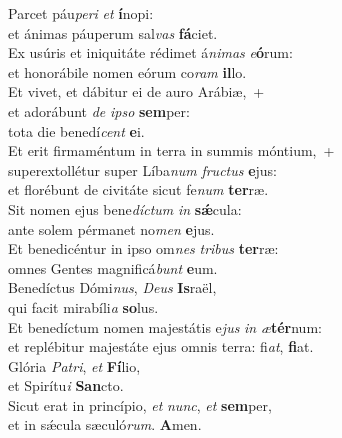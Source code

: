 \oddverse Parcet páu\textit{pe}\textit{ri} \textit{et} \textbf{í}nopi:~\*\\
\oddverse et ánimas páuperum sal\textit{vas} \textbf{fá}ciet.\\
\evenverse Ex usúris et iniquitáte rédimet á\textit{ni}\textit{mas} \textit{e}\textbf{ó}rum:~\*\\
\evenverse et honorábile nomen eórum co\textit{ram} \textbf{il}lo.\\
\oddverse Et vivet, et dábitur ei de auro Arábiæ,~+\\
\oddverse  et adorábunt \textit{de} \textit{i}\textit{pso} \textbf{sem}per:~\*\\
\oddverse tota die benedí\textit{cent} \textbf{e}i.\\
\evenverse Et erit firmaméntum in terra in summis móntium,~+\\
\evenverse  superextollétur super Líba\textit{num} \textit{fru}\textit{ctus} \textbf{e}jus:~\*\\
\evenverse et florébunt de civitáte sicut fe\textit{num} \textbf{ter}ræ.\\
\oddverse Sit nomen ejus bene\textit{dí}\textit{ctum} \textit{in} \textbf{sǽ}cula:~\*\\
\oddverse ante solem pérmanet no\textit{men} \textbf{e}jus.\\
\evenverse Et benedicéntur in ipso om\textit{nes} \textit{tri}\textit{bus} \textbf{ter}ræ:~\*\\
\evenverse omnes Gentes magnificá\textit{bunt} \textbf{e}um.\\
\oddverse Benedíctus Dómi\textit{nus}, \textit{De}\textit{us} \textbf{Is}raël,~\*\\
\oddverse qui facit mirabíli\textit{a} \textbf{so}lus.\\
\evenverse Et benedíctum nomen majestátis e\textit{jus} \textit{in} \textit{æ}\textbf{tér}num:~\*\\
\evenverse et replébitur majestáte ejus omnis terra: fi\textit{at}, \textbf{fi}at.\\
\oddverse Glória \textit{Pa}\textit{tri}, \textit{et} \textbf{Fí}lio,~\*\\
\oddverse et Spirítu\textit{i} \textbf{San}cto.\\
\evenverse Sicut erat in princípio, \textit{et} \textit{nunc}, \textit{et} \textbf{sem}per,~\*\\
\evenverse et in sǽcula sæculó\textit{rum}. \textbf{A}men.\\
